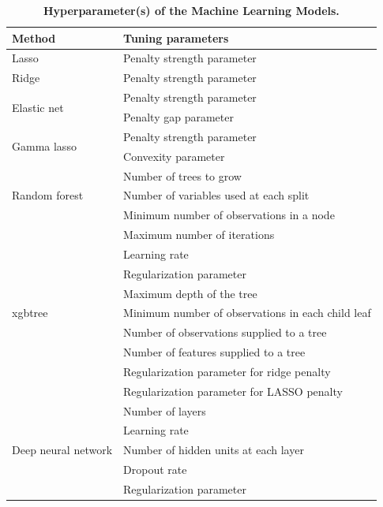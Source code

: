 \begin{refsection}
\begin{table}[htbp]
  \centering
    \begin{tabular}{l|l}
    Method & Tuning parameters \\
    \midrule
    Lasso & Penalty strength parameter \\
    \midrule
    Ridge & Penalty strength parameter \\
    \midrule
    \multirow{2}[2]{*}{Elastic net} & Penalty strength parameter \\
          & Penalty gap parameter \\
    \midrule
    \multirow{2}[2]{*}{Gamma lasso} & Penalty strength parameter \\
          & Convexity parameter \\
    \midrule
    \multirow{3}[2]{*}{Random forest} & Number of trees to grow \\
          & Number of variables used at each split \\
          & Minimum number of observations in a node \\
    \midrule
    \multirow{9}[2]{*}{xgbtree} & Maximum number of iterations \\
          & Learning rate \\
          & Regularization parameter \\
          & Maximum depth of the tree \\
          & Minimum number of observations in each child leaf \\
          & Number of observations supplied to a tree \\
          & Number of features supplied to a tree \\
          & Regularization parameter for ridge penalty \\
          & Regularization parameter for LASSO penalty \\
    \midrule
    \multirow{5}[1]{*}{Deep neural network} & Number of layers  \\
          & Learning rate \\
          & Number of hidden units at each layer \\
          & Dropout rate \\
          & Regularization parameter \\
    \end{tabular}%
  \caption{{\bf Hyperparameter(s) of the Machine Learning Models.}}
  \label{tab:hyperpara}%
\end{table}%


\end{refsection}
